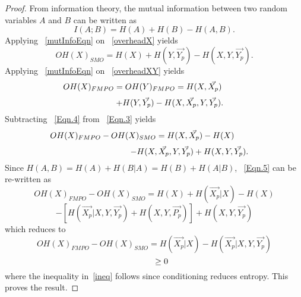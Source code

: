 \documentclass[conference]{IEEEtran}
\theoremstyle{definition}
\begin{document}
\begin{proof}
From information theory, the mutual information between two random variables $A$ and $B$ can be written as
\begin{equation}
I(A;B)=H(A) + H(B) - H(A,B).
\label{mutInfoEqn}
\end{equation}
Applying ~\eqref{mutInfoEqn} on ~\eqref{overheadX} yields
\begin{equation}
OH(X)_{SMO}= H(X)+H(Y,\vec{Y_p})-H(X,Y,\vec{Y_p}).
\label{Eqn.4}
\end{equation}
Applying ~\eqref{mutInfoEqn} on ~\eqref{overheadXY} yields
\begin{equation}
\hspace*{-1 cm} OH(X)_{FMPO}=OH(Y)_{FMPO}= H(X,\vec{X_p})
\nonumber
\end{equation}
\begin{equation}
\hspace*{1.3 cm} +H(Y,\vec{Y_p})-H(X,\vec{X_p},Y,\vec{Y_p}).
\label{Eqn.3}
\end{equation}
Subtracting ~\eqref{Eqn.4} from ~\eqref{Eqn.3} yields 
\begin{equation}
\hspace*{-1 cm} OH(X)_{FMPO}-OH(X)_{SMO}=H(X,\vec{X_p})-H(X)
\nonumber
\end{equation}
\begin{equation}
\hspace*{3 cm} -H(X,\vec{X_p},Y,\vec{Y_p})+H(X,Y,\vec{Y_p}).
\label{Eqn.5}
\end{equation}
Since $H(A,B) = H(A) + H(B|A) = H(B) + H(A|B) $, ~\eqref{Eqn.5} can be re-written as
\begin{equation}
OH(X)_{FMPO}-OH(X)_{SMO}=H(X)+H(\vec{X_p}|X)-H(X)
\nonumber
\end{equation}
\begin{equation}
-[H(\vec{X_p}|X,Y,\vec{Y_p})+H(X,Y,\vec{P_p})] + H(X,Y,\vec{Y_p})
\nonumber
\end{equation}
which reduces to 
\begin{equation}
OH(X)_{FMPO}-OH(X)_{SMO}=H(\vec{X_p}|X)- H(\vec{X_p}|X,Y,\vec{Y_p})
\label{lasteqn}
\end{equation}
\begin{equation}
\hspace*{0.6 cm} \ge 0
\label{ineq}
\end{equation}
where the inequality in~\eqref{ineq} follows since conditioning reduces entropy. This proves the result.
\end{proof}


\vspace{-0.2 cm}
\end{document}

